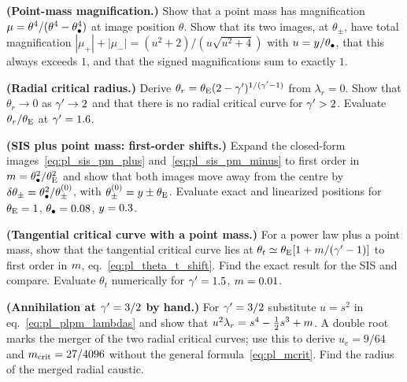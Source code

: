 \begin{exercise}
\label{ex:pl_point_mass_mag}
\textbf{(Point-mass magnification.)}
Show that a point mass has magnification
$\mu=\theta^4/(\theta^4-\theta_{\bullet}^4)$ at image position $\theta$.
Show that its two images, at $\theta_\pm$, have total magnification
$|\mu_+|+|\mu_-|=(u^2+2)/(u\sqrt{u^2+4})$ with $u=y/\theta_{\bullet}$, that
this always exceeds $1$, and that the signed magnifications sum to
exactly $1$.
\end{exercise}

\begin{exercise}
\label{ex:pl_radial_radius}
\textbf{(Radial critical radius.)}
Derive $\theta_r=\theta_{\mathrm{E}}(2-\gamma')^{1/(\gamma'-1)}$ from $\lambda_r=0$.
Show that $\theta_r\to0$ as $\gamma'\to2$ and that there is no radial
critical curve for $\gamma'>2$.  Evaluate $\theta_r/\theta_{\mathrm{E}}$ at
$\gamma'=1.6$.
\end{exercise}

\begin{exercise}
\label{ex:pl_sis_pm_shift}
\textbf{(SIS plus point mass: first-order shifts.)}
Expand the closed-form images~\eqref{eq:pl_sis_pm_plus}
and~\eqref{eq:pl_sis_pm_minus} to first order in
$m=\theta_{\bullet}^2/\theta_{\mathrm{E}}^2$ and show that both images move away from
the centre by $\delta\theta_\pm=\theta_{\bullet}^2/\theta_\pm^{(0)}$, with
$\theta_\pm^{(0)}=y\pm\theta_{\mathrm{E}}$.  Evaluate exact and linearized
positions for $\theta_{\mathrm{E}}=1$, $\theta_{\bullet}=0.08$, $y=0.3$.
\end{exercise}

\begin{exercise}
\label{ex:pl_tangential_shift}
\textbf{(Tangential critical curve with a point mass.)}
For a power law plus a point mass, show that the tangential critical
curve lies at $\theta_t\simeq\theta_{\mathrm{E}}[1+m/(\gamma'-1)]$ to first order in
$m$, eq.~\eqref{eq:pl_theta_t_shift}.  Find the exact result for the
SIS and compare.  Evaluate $\theta_t$ numerically for $\gamma'=1.5$,
$m=0.01$.
\end{exercise}

\begin{exercise}
\label{ex:pl_annihilation_15}
\textbf{(Annihilation at $\gamma'=3/2$ by hand.)}
For $\gamma'=3/2$ substitute $u=s^2$ in eq.~\eqref{eq:pl_plpm_lambdas} and
show that $u^2\lambda_r=s^4-\tfrac12 s^3+m$.  A double root marks
the merger of the two radial critical curves; use this to derive
$u_c=9/64$ and $m_{\rm crit}=27/4096$ without the general
formula~\eqref{eq:pl_mcrit}.  Find the radius of the merged radial
caustic.
\end{exercise}

